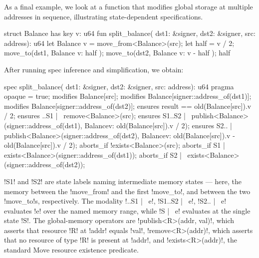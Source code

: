 
As a final example, we look at a function that modifies global storage at multiple addresses in sequence, illustrating state-dependent specifications.

\begin{MoveBox}
  struct Balance has key { v: u64 }
  fun split_balance(
        dst1: &signer, dst2: &signer,
        src: address): u64 {
    let Balance { v } = move_from<Balance>(src);
    let half = v / 2;
    move_to(dst1, Balance { v: half });
    move_to(dst2, Balance { v: v - half });
    half
  }
\end{MoveBox}

\noindent After running spec inference and simplification, we obtain:

\begin{MoveBox}
  spec split_balance(
         dst1: &signer, dst2: &signer,
         src: address): u64 {
    pragma opaque = true;
    modifies Balance[src];
    modifies Balance[signer::address_of(dst1)];
    modifies Balance[signer::address_of(dst2)];
    ensures result == old(Balance[src]).v / 2;
    ensures ..S1 |~ remove<Balance>(src);
    ensures S1..S2 |~
      publish<Balance>(signer::address_of(dst1),
                       Balance{v: old(Balance[src]).v / 2});
    ensures S2.. |~
      publish<Balance>(signer::address_of(dst2),
                       Balance{v: old(Balance[src]).v
                                  - old(Balance[src]).v / 2});
    aborts_if !exists<Balance>(src);
    aborts_if S1 |~
      exists<Balance>(signer::address_of(dst1));
    aborts_if S2 |~
      exists<Balance>(signer::address_of(dst2));
  }
\end{MoveBox}

\noindent !S1! and !S2! are state labels naming intermediate memory states --- here, the memory between the !move_from! and the first !move_to!, and between the two !move_to!s, respectively.  The modality !..S1 |~ e!, !S1..S2 |~ e!, !S2.. |~ e! evaluates !e! over the named memory range, while !S |~ e! evaluates at the single state !S!.  The global-memory operators are !publish<R>(addr, val)!, which asserts that resource !R! at !addr! equals !val!, !remove<R>(addr)!, which asserts that no resource of type !R! is present at !addr!, and !exists<R>(addr)!, the standard Move resource existence predicate.
